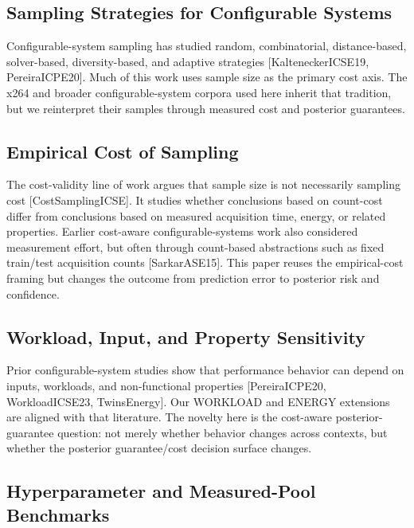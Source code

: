 \documentclass[smallcondensed]{svjour3}
\begin{document}
\subsection{Sampling Strategies for Configurable
Systems}\label{sampling-strategies-for-configurable-systems}

Configurable-system sampling has studied random, combinatorial,
distance-based, solver-based, diversity-based, and adaptive strategies
{[}KalteneckerICSE19, PereiraICPE20{]}. Much of this work uses sample
size as the primary cost axis. The x264 and broader configurable-system
corpora used here inherit that tradition, but we reinterpret their
samples through measured cost and posterior guarantees.

\subsection{Empirical Cost of
Sampling}\label{empirical-cost-of-sampling}

The cost-validity line of work argues that sample size is not
necessarily sampling cost {[}CostSamplingICSE{]}. It studies whether
conclusions based on count-cost differ from conclusions based on
measured acquisition time, energy, or related properties. Earlier
cost-aware configurable-systems work also considered measurement effort,
but often through count-based abstractions such as fixed train/test
acquisition counts {[}SarkarASE15{]}. This paper reuses the
empirical-cost framing but changes the outcome from prediction error to
posterior risk and confidence.

\subsection{Workload, Input, and Property
Sensitivity}\label{workload-input-and-property-sensitivity}

Prior configurable-system studies show that performance behavior can
depend on inputs, workloads, and non-functional properties
{[}PereiraICPE20, WorkloadICSE23, TwinsEnergy{]}. Our WORKLOAD and
ENERGY extensions are aligned with that literature. The novelty here is
the cost-aware posterior-guarantee question: not merely whether behavior
changes across contexts, but whether the posterior guarantee/cost
decision surface changes.

\subsection{Hyperparameter and Measured-Pool
Benchmarks}\label{hyperparameter-and-measured-pool-benchmarks}
\end{document}
